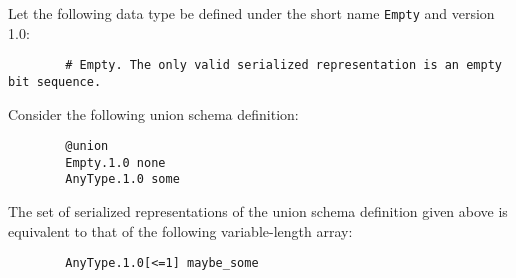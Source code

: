 \begin{remark}
    Let the following data type be defined under the short name \verb|Empty| and version 1.0:

    \begin{verbatim}
        # Empty. The only valid serialized representation is an empty bit sequence.
    \end{verbatim}

    Consider the following union schema definition:

    \begin{verbatim}
        @union
        Empty.1.0 none
        AnyType.1.0 some
    \end{verbatim}

    The set of serialized representations of the union schema definition given above is equivalent to
    that of the following variable-length array:

    \begin{verbatim}
        AnyType.1.0[<=1] maybe_some
    \end{verbatim}
\end{remark}

